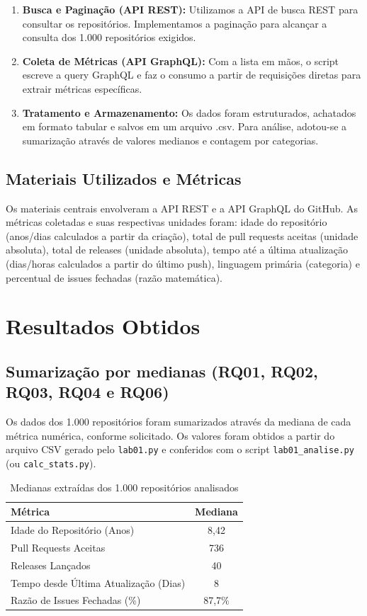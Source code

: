 \documentclass[12pt,a4paper]{article}
\begin{document}
\begin{enumerate}
    \item \textbf{Busca e Paginação (API REST):} Utilizamos a API de busca REST para consultar os repositórios. Implementamos a paginação para alcançar a consulta dos 1.000 repositórios exigidos.
    \item \textbf{Coleta de Métricas (API GraphQL):} Com a lista em mãos, o script escreve a query GraphQL e faz o consumo a partir de requisições diretas para extrair métricas específicas.
    \item \textbf{Tratamento e Armazenamento:} Os dados foram estruturados, achatados em formato tabular e salvos em um arquivo .csv. Para análise, adotou-se a sumarização através de valores medianos e contagem por categorias.
\end{enumerate}

\subsection*{Materiais Utilizados e Métricas}
Os materiais centrais envolveram a API REST e a API GraphQL do GitHub. As métricas coletadas e suas respectivas unidades foram: idade do repositório (anos/dias calculados a partir da criação), total de pull requests aceitas (unidade absoluta), total de releases (unidade absoluta), tempo até a última atualização (dias/horas calculados a partir do último push), linguagem primária (categoria) e percentual de issues fechadas (razão matemática).

\section{Resultados Obtidos}

\subsection*{Sumarização por medianas (RQ01, RQ02, RQ03, RQ04 e RQ06)}

Os dados dos 1.000 repositórios foram sumarizados através da mediana de cada métrica numérica, conforme solicitado. Os valores foram obtidos a partir do arquivo CSV gerado pelo \texttt{lab01.py} e conferidos com o script \texttt{lab01\_analise.py} (ou \texttt{calc\_stats.py}).

\begin{table}[H]
    \centering
    \caption{Medianas extraídas dos 1.000 repositórios analisados}
    \begin{tabular}{lc}
        \toprule
        \textbf{Métrica} & \textbf{Mediana} \\
        \midrule
        Idade do Repositório (Anos) & 8,42 \\
        Pull Requests Aceitas & 736 \\
        Releases Lançados & 40 \\
        Tempo desde Última Atualização (Dias) & 8 \\
        Razão de Issues Fechadas (\%) & 87,7\% \\
        \bottomrule
    \end{tabular}
\end{table}
\end{document}

